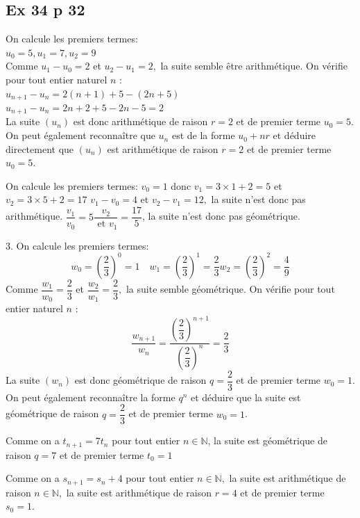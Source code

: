 \documentclass[a4paper,french]{book}
\begin{document}
\subsection*{Ex 34 p 32}
\begin{enumMet}
    \item On calcule les premiers termes:\\
    $u_{0}=5, u_{1}=7, u_{2}=9$\\
    Comme $u_{1}-u_{0}=2$ et $u_{2}-u_{1}=2,$ la suite semble être arithmétique. On vérifie pour tout entier naturel $n$ :\\
    $u_{n+1}-u_{n}=2(n+1)+5-(2 n+5)$\\
    $u_{n+1}-u_{n}=2 n+2+5-2 n-5=2$\\
    La suite $\left(u_{n}\right)$ est donc arithmétique de raison $r=2$ et de premier terme $u_{0}=5$.\\
     On peut également reconnaître que $u_{n}$ est de la forme $u_{0}+n r$ et déduire directement que $\left(u_{n}\right)$ est arithmétique de raison $r=2$ et de premier terme $u_{0}=5$.
    \item On calcule les premiers termes:
    $v_{0}=1$ donc $v_{1}=3 \times 1+2=5$ et $v_{2}=3 \times 5+2=17$
    $v_{1}-v_{0}=4$ et $v_{2}-v_{1}=12,$ la suite n'est donc pas arithmétique. $\dfrac{v_{1}}{v_{0}}=5 \dfrac{v_{2}}{\text { et } v_{1}}=\dfrac{17}{5}$, la suite n'est donc pas géométrique.
    \item 3. On calcule les premiers termes:
    $$
    w_{0}=\left(\dfrac{2}{3}\right)^{0}=1 \quad w_{1}=\left(\dfrac{2}{3}\right)^{1}=\dfrac{2}{3} w_{2}=\left(\dfrac{2}{3}\right)^{2}=\dfrac{4}{9}
    $$
    Comme $\dfrac{w_{1}}{w_{0}}=\dfrac{2}{3}$ et $\dfrac{w_{2}}{w_{1}}=\dfrac{2}{3},$ la suite semble géométrique. On vérifie pour tout entier naturel $n$ :
    $$
    \dfrac{w_{n+1}}{w_{n}}=\dfrac{\left(\dfrac{2}{3}\right)^{n+1}}{\left(\dfrac{2}{3}\right)^{n}}=\dfrac{2}{3}
    $$
    La suite $\left(w_{n}\right)$ est donc géométrique de raison $q=\dfrac{2}{3}$ et de premier terme $w_{0}=1$.\\
     On peut également reconnaître la forme $q^{n}$ et déduire que la suite est géométrique de raison $q=\dfrac{2}{3}$ et de premier terme $w_{0}=1$.
    \item Comme on a $t_{n+1}=7 t_{n}$ pour tout entier $n \in \mathbb{N}$, la suite est géométrique de raison $q=7$ et de premier terme $t_{0}=1$
    \item Comme on a $s_{n+1}=s_{n}+4$ pour tout entier $n \in \mathbb{N},$ la suite est arithmétique de raison $n \in \mathbb{N},$ la suite est arithmétique de raison $r=4$ et de premier terme $s_{0}=1 .$
\end{enumMet}
\end{document}
